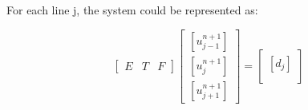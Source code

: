 \documentclass[12pt]{article}
\begin{document}

























For each line j, the system could be represented as:

\[
\left[
\begin{array}{c|c|c}
E & T & F 
\end{array}
\right]
\begin{bmatrix}
    [u_{j-1}^{n+1}] \\
    [u_{j}^{n+1}] \\
   [ u_{j+1}^{n+1}]
\end{bmatrix}
=
\begin{bmatrix}
    [d_{j}] \\
\end{bmatrix}
\]
\end{document}
